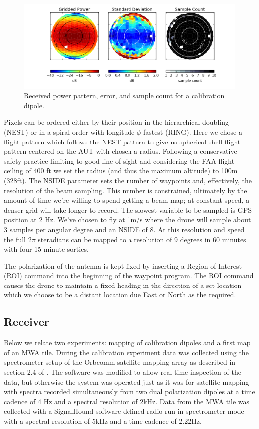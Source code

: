 \documentclass[preprint2,numberedappendix,tighten,twocolappendix]{aastex6}
\begin{document}
\begin{figure}[ht]
\begin{center}
\includegraphics[width=\textwidth]{figures/GB_power_rms_count.png}
\caption{Received power pattern, error, and sample count for a calibration dipole.}
\label{fig:beam_std_count}
\end{center}
\end{figure}
Pixels can be ordered either by their position in the hierarchical doubling (NEST) or in a spiral order with  longitude $\phi$ fastest (RING).  Here we chose a flight pattern which follows the NEST pattern to give us spherical shell flight pattern centered on the AUT with chosen a radius. Following a conservative safety practice limiting to good line of sight and considering the FAA flight ceiling of 400 ft we set the radius (and thus the maximum altitude) to 100m (328ft). The NSIDE parameter sets the number of waypoints and, effectively, the resolution of the beam sampling.  This number is constrained, ultimately by the amount of time we're willing to spend getting a beam map; at constant speed, a denser grid will take longer to record.  The slowest variable to be sampled is GPS position at 2 Hz. We've chosen to fly at 1m/s where the drone will sample about 3 samples per angular degree and an NSIDE of 8.  At this resolution and speed the full $2\pi$ steradians can be mapped to a resolution of 9 degrees in 60 minutes with four 15 minute sorties.

The polarization of the antenna is kept fixed by inserting a Region of Interest (ROI) command into the beginning of the waypoint program.  The ROI command causes the drone to maintain a fixed heading in the direction of a set location which we choose to be a distant location due East or North as the required.


\subsection{Receiver}
Below we relate two experiments: mapping of calibration dipoles and a first map of an MWA tile. During the calibration experiment data was collected using the spectrometer setup of the Orbcomm satellite mapping array as described in section 2.4 of \citet{2016:NebenHERAdish}. The software was modified to allow real time inspection of the data, but otherwise the system was operated just as it was for satellite mapping with spectra recorded simultaneously from two dual polarization dipoles at a time cadence of 4 Hz and a spectral resolution of 2kHz. Data from the MWA tile was collected with a SignalHound software defined radio run in spectrometer mode with a spectral resolution of 5kHz and a time cadence of 2.22Hz. 
\end{document}
